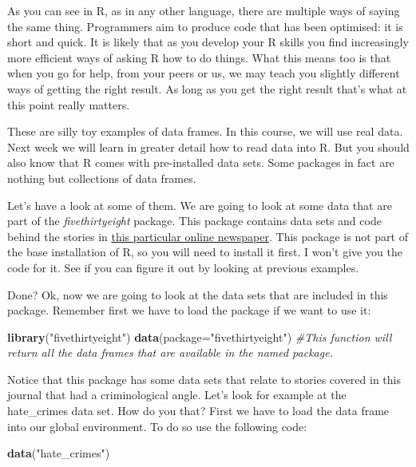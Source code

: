 \documentclass[]{book}
\newenvironment{Shaded}{\begin{snugshade}}{\end{snugshade}}
\newcommand{\CommentTok}[1]{\textcolor[rgb]{0.56,0.35,0.01}{\textit{#1}}}
\newcommand{\DataTypeTok}[1]{\textcolor[rgb]{0.13,0.29,0.53}{#1}}
\newcommand{\KeywordTok}[1]{\textcolor[rgb]{0.13,0.29,0.53}{\textbf{#1}}}
\newcommand{\NormalTok}[1]{#1}
\newcommand{\StringTok}[1]{\textcolor[rgb]{0.31,0.60,0.02}{#1}}
\theoremstyle{definition}
\theoremstyle{definition}
\theoremstyle{definition}
\theoremstyle{remark}
\begin{document}
As you can see in R, as in any other language, there are multiple ways
of saying the same thing. Programmers aim to produce code that has been
optimised: it is short and quick. It is likely that as you develop your
R skills you find increasingly more efficient ways of asking R how to do
things. What this means too is that when you go for help, from your
peers or us, we may teach you slightly different ways of getting the
right result. As long as you get the right result that's what at this
point really matters.

These are silly toy examples of data frames. In this course, we will use
real data. Next week we will learn in greater detail how to read data
into R. But you should also know that R comes with pre-installed data
sets. Some packages in fact are nothing but collections of data frames.

Let's have a look at some of them. We are going to look at some data
that are part of the \emph{fivethirtyeight} package. This package
contains data sets and code behind the stories in
\href{http://fivethirtyeight.com/}{this particular online newspaper}.
This package is not part of the base installation of R, so you will need
to install it first. I won't give you the code for it. See if you can
figure it out by looking at previous examples.

Done? Ok, now we are going to look at the data sets that are included in
this package. Remember first we have to load the package if we want to
use it:

\begin{Shaded}
\begin{Highlighting}[]
\KeywordTok{library}\NormalTok{(}\StringTok{"fivethirtyeight"}\NormalTok{)}
\KeywordTok{data}\NormalTok{(}\DataTypeTok{package=}\StringTok{"fivethirtyeight"}\NormalTok{) }\CommentTok{#This function will return all the data frames that are available in the named package.}
\end{Highlighting}
\end{Shaded}

Notice that this package has some data sets that relate to stories
covered in this journal that had a criminological angle. Let's look for
example at the hate\_crimes data set. How do you that? First we have to
load the data frame into our global environment. To do so use the
following code:

\begin{Shaded}
\begin{Highlighting}[]
\KeywordTok{data}\NormalTok{(}\StringTok{"hate_crimes"}\NormalTok{)}
\end{Highlighting}
\end{Shaded}
\end{document}
